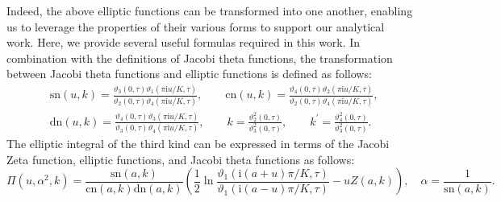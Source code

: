 \documentclass[11pt,reqno]{amsart}
\newcommand{\ii}{\mathrm{i}}
\newcommand{\sn}{\mathrm{sn}}
\newcommand{\cn}{\mathrm{cn}}
\newcommand{\dn}{\mathrm{dn}}
\numberwithin{equation}{section}
\begin{document}
Indeed, the above elliptic functions can be transformed into one another, enabling us to leverage the properties of their various forms to support our analytical work.
Here, we provide several useful formulas required in this work.
In combination with the definitions of Jacobi theta functions, the transformation between Jacobi theta functions and elliptic functions is defined as follows:
\begin{equation}\label{eq:formula-trans-theta-elliptic}
	\begin{split}
		&\sn(u,k)=\frac{\vartheta_3(0,\tau)\vartheta_1(\pi\ii u/K,\tau)}{\vartheta_2(0,\tau)\vartheta_4(\pi\ii u/K,\tau)},\qquad
		\cn(u,k)=\frac{\vartheta_4(0,\tau)\vartheta_2(\pi\ii u/K,\tau)}{\vartheta_2(0,\tau)\vartheta_4(\pi\ii u/K,\tau)}, \\
		&\dn(u,k)=\frac{\vartheta_4(0,\tau)\vartheta_3(\pi\ii u/K,\tau)}{\vartheta_3(0,\tau)\vartheta_4(\pi\ii u/K,\tau)}, \qquad 
		k=\frac{\vartheta_2^2(0,\tau)}{\vartheta_3^2(0,\tau)}, \qquad
		k^{\prime}=\frac{\vartheta_4^2(0,\tau)}{\vartheta_3^2(0,\tau)}.
	\end{split}
\end{equation}
The elliptic integral of the third kind can be expressed in terms of the Jacobi Zeta function, elliptic functions, and Jacobi theta functions as follows:
\begin{equation}\label{eq:formula-trans-Pi-Zeta-theta}
	\Pi(u,\alpha^2,k)=\frac{\sn(a,k)}{\cn(a,k)\dn(a,k)}\left(\frac{1}{2}\ln \frac{\vartheta_1(\ii(a+u)\pi/K,\tau)}{\vartheta_1(\ii(a-u)\pi/K,\tau)}-uZ(a,k)\right),\quad \alpha=\frac{1}{\sn(a,k)}.
\end{equation}
\end{document}
